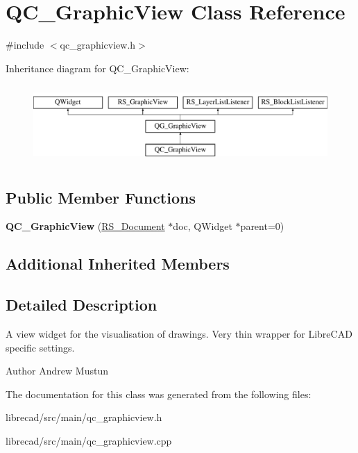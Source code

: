 \hypertarget{classQC__GraphicView}{\section{Q\-C\-\_\-\-Graphic\-View Class Reference}
\label{classQC__GraphicView}
}


{\ttfamily \#include $<$qc\-\_\-graphicview.\-h$>$}

Inheritance diagram for Q\-C\-\_\-\-Graphic\-View\-:\begin{figure}[H]
\begin{center}
\leavevmode
\includegraphics[height=3.000000cm]{classQC__GraphicView}
\end{center}
\end{figure}
\subsection*{Public Member Functions}
\begin{DoxyCompactItemize}
\item 
\hypertarget{classQC__GraphicView_adbd6e2e5e739e33c70b75871c82fe1e7}{{\bfseries Q\-C\-\_\-\-Graphic\-View} (\hyperlink{classRS__Document}{R\-S\-\_\-\-Document} $\ast$doc, Q\-Widget $\ast$parent=0)}\label{classQC__GraphicView_adbd6e2e5e739e33c70b75871c82fe1e7}

\end{DoxyCompactItemize}
\subsection*{Additional Inherited Members}


\subsection{Detailed Description}
A view widget for the visualisation of drawings. Very thin wrapper for Libre\-C\-A\-D specific settings.

\begin{DoxyAuthor}{Author}
Andrew Mustun 
\end{DoxyAuthor}


The documentation for this class was generated from the following files\-:\begin{DoxyCompactItemize}
\item 
librecad/src/main/qc\-\_\-graphicview.\-h\item 
librecad/src/main/qc\-\_\-graphicview.\-cpp\end{DoxyCompactItemize}
